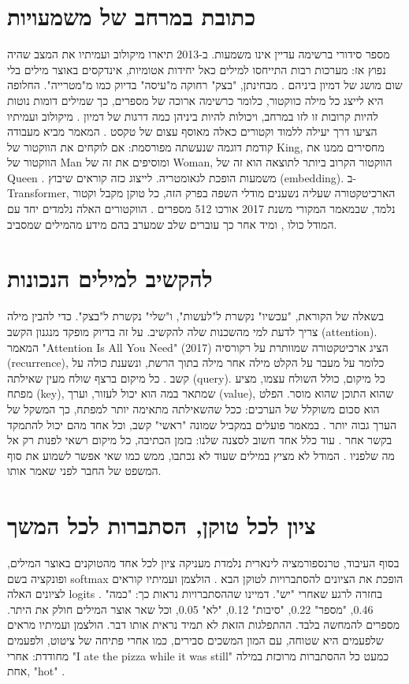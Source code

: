 \section{כתובת במרחב של משמעויות}
מספר סידורי ברשימה עדיין אינו משמעות. ב-2013 תיארו מיקולוב ועמיתיו את המצב שהיה נפוץ אז: מערכות רבות התייחסו למילים כאל יחידות אטומיות, אינדקסים באוצר מילים בלי שום מושג של דמיון ביניהם \cite{S-ch04-05}. מבחינתן, "בצק" רחוקה מ"עיסה" בדיוק כמו מ"מטרייה".
החלופה היא לייצג כל מילה כווקטור, כלומר כרשימה ארוכה של מספרים, כך שמילים דומות נוטות להיות קרובות זו לזו במרחב, ויכולות להיות ביניהן כמה דרגות של דמיון \cite{S-ch04-05}. מיקולוב ועמיתיו הציעו דרך יעילה ללמוד וקטורים כאלה מאוסף עצום של טקסט \cite{S-ch04-05}. המאמר מביא מעבודה קודמת דוגמה שנעשתה מפורסמת: אם לוקחים את הווקטור של King, מחסירים ממנו את הווקטור של Man ומוסיפים את זה של Woman, הווקטור הקרוב ביותר לתוצאה הוא זה של Queen \cite{S-ch04-05}. משמעות הופכת לגאומטריה.
לייצוג כזה קוראים שיבוץ (embedding). ב-Transformer, הארכיטקטורה שעליה נשענים מודלי השפה בפרק הזה, כל טוקן מקבל וקטור נלמד, שבמאמר המקורי משנת 2017 אורכו 512 מספרים \cite{S-ch04-01}. הווקטורים האלה נלמדים יחד עם המודל כולו \cite{S-ch04-01}, ומיד אחר כך עוברים שלב שמערב בהם מידע מהמילים שמסביב.
\section{להקשיב למילים הנכונות}
בשאלה של הקוראת, "עכשיו" נקשרת ל"לעשות", ו"שלי" נקשרת ל"בצק". כדי להבין מילה צריך לדעת למי מהשכנות שלה להקשיב. על זה בדיוק מופקד מנגנון הקשב (attention).
המאמר "Attention Is All You Need" (2017) הציג ארכיטקטורה שמוותרת על רקורסיה (recurrence), כלומר על מעבר על הקלט מילה אחר מילה בתוך הרשת, ונשענת כולה על קשב \cite{S-ch04-01}. כל מיקום ברצף שולח מעין שאילתה (query). כל מיקום, כולל השולח עצמו, מציע מפתח (key), שמתאר במה הוא יכול לעזור, וערך (value), שהוא התוכן שהוא מוסר. הפלט הוא סכום משוקלל של הערכים: ככל שהשאילתה מתאימה יותר למפתח, כך המשקל של הערך גבוה יותר \cite{S-ch04-01}. במאמר פועלים במקביל שמונה "ראשי" קשב, וכל אחד מהם יכול להתמקד בקשר אחר \cite{S-ch04-01}.
עוד כלל אחד חשוב לסצנה שלנו: בזמן הכתיבה, כל מיקום רשאי לפנות רק אל מה שלפניו \cite{S-ch04-01}. המודל לא מציץ במילים שעוד לא נכתבו, ממש כמו שאי אפשר לשמוע את סוף המשפט של החבר לפני שאמר אותו.
\section{ציון לכל טוקן, הסתברות לכל המשך}
בסוף העיבוד, טרנספורמציה לינארית נלמדת מעניקה ציון לכל אחד מהטוקנים באוצר המילים, ופונקציה בשם softmax הופכת את הציונים להסתברויות לטוקן הבא \cite{S-ch04-01}. הולצמן ועמיתיו קוראים לציונים האלה logits \cite{S-ch04-03}.
בחזרה לרגע שאחרי "יש". דמיינו שההסתברויות נראות כך: "כמה" 0.46, "מספר" 0.22, "סיבות" 0.12, "לא" 0.05, וכל שאר אוצר המילים חולק את היתר. מספרים להמחשה בלבד.
ההתפלגות הזאת לא תמיד נראית אותו דבר. הולצמן ועמיתיו מראים שלפעמים היא שטוחה, עם המון המשכים סבירים, כמו אחרי פתיחה של ציטוט, ולפעמים מחודדת: אחרי "I ate the pizza while it was still" כמעט כל ההסתברות מרוכזת במילה אחת, "hot" \cite{S-ch04-03}.
